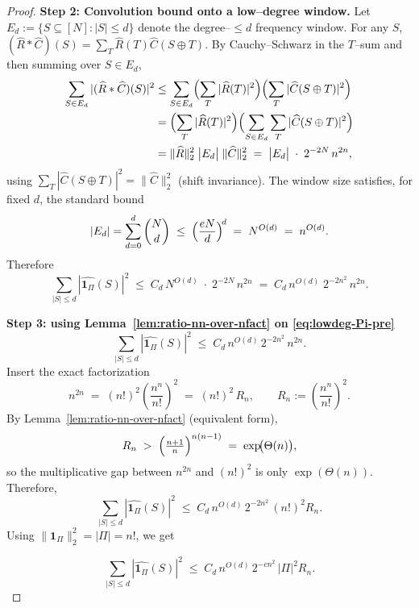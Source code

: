 \documentclass[a4paper,onecolumn,11pt,unpublished]{quantumarticle}
\theoremstyle{remark}
\begin{document}
\begin{proof}
\medskip
\noindent\textbf{Step 2: Convolution bound onto a low–degree window.}
Let $E_d:=\{S\subseteq[N]:|S|\le d\}$ denote the degree–$\le d$ frequency window.
For any $S$,
\(
(\widehat{R}*\widehat{C})(S)=\sum_{T}\widehat{R}(T)\widehat{C}(S\oplus T).
\)
By Cauchy–Schwarz in the $T$–sum and then summing over $S\in E_d$,
\begin{align*}
  \sum_{S\in E_d} |(\widehat{R}*\widehat{C})(S)|^2
  &\le \sum_{S\in E_d}
        \Bigl(\sum_T |\widehat{R}(T)|^2\Bigr)
        \Bigl(\sum_T |\widehat{C}(S\oplus T)|^2\Bigr) \\
  &= \Bigl(\sum_T |\widehat{R}(T)|^2\Bigr)
     \Bigl(\sum_{S\in E_d}\sum_T |\widehat{C}(S\oplus T)|^2\Bigr) \\
  &= \|\widehat{R}\|_2^2\;\bigl|E_d\bigr|\;\|\widehat{C}\|_2^2
   \;=\; \bigl|E_d\bigr|\;\cdot\;2^{-2N}\,n^{2n},
\end{align*}
using $\sum_T |\widehat{C}(S\oplus T)|^2=\|\widehat{C}\|_2^2$ (shift invariance).
The window size satisfies, for fixed $d$, the standard bound
\[
  |E_d|=\sum_{d=0}^{d}\binom{N}{d}\;\le\; \Bigl(\frac{eN}{d}\Bigr)^{\!d}
  \;=\; N^{O(d)} \;=\; n^{O(d)}.
\]
Therefore
\begin{equation}
  \sum_{|S|\le d} |\widehat{\mathbf{1}_\Pi}(S)|^2
  \;\le\; C_d\,N^{O(d)}\;\cdot\;2^{-2N}\,n^{2n}
  \;=\; C_d\,n^{O(d)}\;2^{-2n^2}\,n^{2n}.
  \label{eq:lowdeg-Pi-pre}
\end{equation}

\medskip
\noindent\textbf{Step 3: using Lemma~\ref{lem:ratio-nn-over-nfact} on  \eqref{eq:lowdeg-Pi-pre}}
\[
\sum_{|S|\le d} |\widehat{\mathbf{1}_\Pi}(S)|^2
\;\le\; C_d\,n^{O(d)}\,2^{-2n^2}\,n^{2n}.
\]
Insert the exact factorization
\[
n^{2n} \;=\; (n!)^2\!\left(\frac{n^n}{n!}\right)^{\!2}
\;=\; (n!)^2\,R_n,
\qquad R_n:=\left(\frac{n^n}{n!}\right)^{\!2}.
\]
By Lemma~\ref{lem:ratio-nn-over-nfact} (equivalent form),
\[
R_n \;>\; \Bigl(\tfrac{n+1}{n}\Bigr)^{n(n-1)}
\;=\;\exp\!\bigl(\Theta(n)\bigr),
\]
so the multiplicative gap between $n^{2n}$ and $(n!)^2$ is only $\exp(\Theta(n))$.
Therefore,
\[
\sum_{|S|\le d} |\widehat{\mathbf{1}_\Pi}(S)|^2
\;\le\; C_d\,n^{O(d)}\,2^{-2n^2}\,(n!)^2R_n.
\]
Using $\|\mathbf{1}_\Pi\|_2^2=|\Pi|=n!$, we get%

\[
\sum_{|S|\le d} |\widehat{\mathbf{1}_\Pi}(S)|^2
\;\le\; C_d\,n^{O(d)}\,2^{-c n^2}\,|\Pi|^2R_n.
\]

\end{proof}
\end{document}
